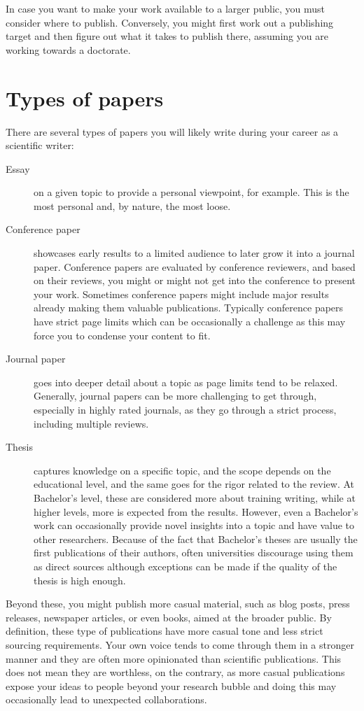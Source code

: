 In case you want to make your work available to a larger public, you must consider where to publish.
Conversely, you might first work out a publishing target and then figure out what it takes to publish there, assuming you are working towards a doctorate.

\section{Types of papers}

There are several types of papers you will likely write during your career as a scientific writer:

\begin{description}
    \item[Essay] on a given topic to provide a personal viewpoint, for example. This is the most personal and, by nature, the most loose.
    \item[Conference paper] showcases early results to a limited audience to later grow it into a journal paper. Conference papers are evaluated by conference reviewers, and based on their reviews, you might or might not get into the conference to present your work. Sometimes conference papers might include major results already making them valuable publications. Typically conference papers have strict page limits which can be occasionally a challenge as this may force you to condense your content to fit.
    \item[Journal paper] goes into deeper detail about a topic as page limits tend to be relaxed. Generally, journal papers can be more challenging to get through, especially in highly rated journals, as they go through a strict process, including multiple reviews.
    \item[Thesis] captures knowledge on a specific topic, and the scope depends on the educational level, and the same goes for the rigor related to the review. At Bachelor's level, these are considered more about training writing, while at higher levels, more is expected from the results. However, even a Bachelor's work can occasionally provide novel insights into a topic and have value to other researchers. Because of the fact that Bachelor's theses are usually the first publications of their authors, often universities discourage using them as direct sources although exceptions can be made if the quality of the thesis is high enough.
\end{description}

Beyond these, you might publish more casual material, such as blog posts, press releases, newspaper articles, or even books, aimed at the broader public.
By definition, these type of publications have more casual tone and less strict sourcing requirements.
Your own voice tends to come through them in a stronger manner and they are often more opinionated than scientific publications.
This does not mean they are worthless, on the contrary, as more casual publications expose your ideas to people beyond your research bubble and doing this may occasionally lead to unexpected collaborations.

